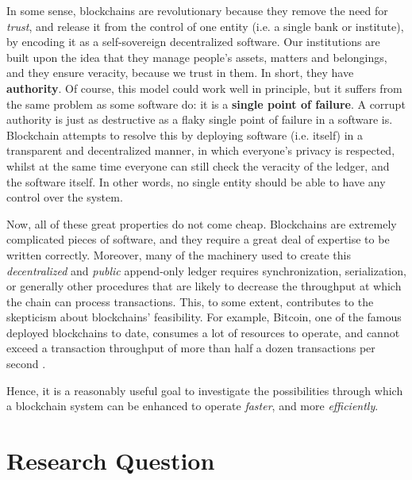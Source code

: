 In some sense, blockchains are revolutionary because they remove the need for \textit{trust}, and
release it from the control of one entity (i.e. a single bank or institute), by encoding it as a
self-sovereign decentralized software. Our institutions are built upon the idea that they manage
people's assets, matters and belongings, and they ensure veracity, because we trust in them. In
short, they have \textbf{authority}. Of course, this model could work well in principle, but it
suffers from the same problem as some software do: it is a \textbf{single point of failure}. A
corrupt authority is just as destructive as a flaky single point of failure in a software is.
Blockchain attempts to resolve this by deploying software (i.e. itself) in a transparent and
decentralized manner, in which everyone's privacy is respected, whilst at the same time everyone can
still check the veracity of the ledger, and the software itself. In other words, no single entity
should be able to have any control over the system.

Now, all of these great properties do not come cheap. Blockchains are extremely complicated pieces
of software, and they require a great deal of expertise to be written correctly. Moreover, many of
the machinery used to create this \textit{decentralized} and \textit{public} append-only ledger
requires synchronization, serialization, or generally other procedures that are likely to decrease
the throughput at which the chain can process transactions. This, to some extent, contributes to the
skepticism about blockchains' feasibility. For example, Bitcoin, one of the famous deployed
blockchains to date, consumes a lot of resources to operate, and cannot exceed a transaction
throughput of more than half a dozen transactions per second \cite{security_of_bitcoin}.

Hence, it is a reasonably useful  goal to investigate the possibilities through which a blockchain
system can be enhanced to operate \textit{faster}, and more \textit{efficiently}.

\section{Research Question} \label{chap_intro:sec:resarch_q}

